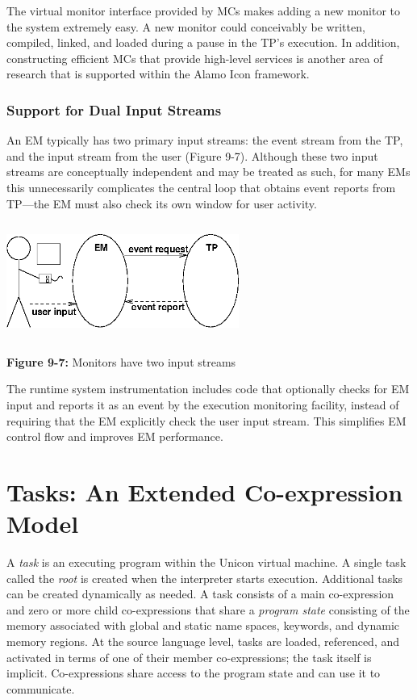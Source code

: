 The virtual monitor interface provided by MCs makes adding a new monitor to
the system extremely easy.  A new monitor could conceivably be written,
compiled, linked, and loaded during a pause in the TP's execution. In
addition, constructing efficient MCs that provide high-level services is
another area of research that is supported within the Alamo Icon framework.

\subsubsection*{Support for Dual Input Streams}

An EM typically has two primary input streams: the event stream from
the TP, and the input stream from the user (Figure 9-7).  Although
these two input streams are conceptually independent and may be
treated as such, for many EMs this unnecessarily complicates
the central loop that obtains event reports from TP---the EM must
also check its own window for user activity.

\begin{center}
\includegraphics[width=3.0in,height=1.5in]{eventstr.png}
\end{center}

{\sffamily\bfseries Figure 9-7:}
{\sffamily Monitors have two input streams}

\bigskip


The runtime system instrumentation includes code that optionally
checks for EM input and reports it as an event by the execution
monitoring facility, instead of requiring that the EM explicitly check
the user input stream.  This simplifies EM control 
flow and improves EM performance.


\section{Tasks: An Extended Co-expression Model}


A {\em task\/} is an executing program within the Unicon virtual
machine. A single task called the {\em root\/} is created
when the interpreter starts execution. Additional tasks can be created
dynamically as needed.
A task consists of a main co-expression and zero or more child
co-expressions that share a {\em program state\/} consisting of
 the memory associated with global and static name
spaces, keywords, and dynamic memory regions.  At the source language level,
tasks are loaded, referenced, and activated in terms of one of their
member co-expressions; the task itself is implicit.  Co-expressions share
access to the program state and can use it to communicate.

